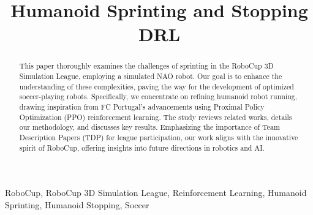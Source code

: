 \documentclass[conference]{IEEEtran}
\begin{document}
\title{Humanoid Sprinting and Stopping DRL}

\author{

    \and

    \and

}


\maketitle

\begin{abstract}

    This paper thoroughly examines the challenges of sprinting in the RoboCup 3D Simulation League, employing a simulated NAO robot. Our goal is to enhance the understanding of these complexities, paving the way for the development of optimized soccer-playing robots. Specifically, we concentrate on refining humanoid robot running, drawing inspiration from FC Portugal's advancements using Proximal Policy Optimization (PPO) reinforcement learning. The study reviews related works, details our methodology, and discusses key results. Emphasizing the importance of Team Description Papers (TDP) for league participation, our work aligns with the innovative spirit of RoboCup, offering insights into future directions in robotics and AI.

\end{abstract}

\begin{IEEEkeywords}
    RoboCup, RoboCup 3D Simulation League, Reinforcement Learning, Humanoid Sprinting, Humanoid Stopping, Soccer
\end{IEEEkeywords}
\end{document}
